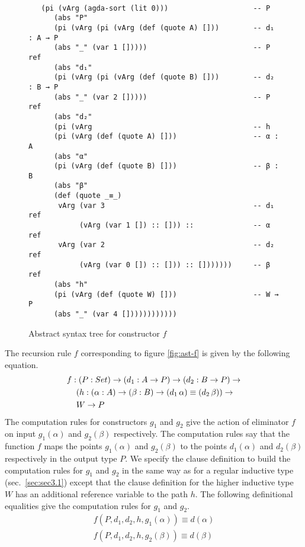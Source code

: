 \documentclass[sigplan,10pt]{acmart}
\begin{document}
\begin{figure}
\begin{center}
\begingroup
\fontsize{7pt}{9pt}\selectfont
\begin{Verbatim}[frame = single]

   (pi (vArg (agda-sort (lit 0)))                    -- P
      (abs "P"
      (pi (vArg (pi (vArg (def (quote A) []))        -- d₁ : A → P
      (abs "_" (var 1 []))))                         -- P ref
      (abs "d₁"
      (pi (vArg (pi (vArg (def (quote B) []))        -- d₂ : B → P
      (abs "_" (var 2 []))))                         -- P ref
      (abs "d₂"
      (pi (vArg                                      -- h
      (pi (vArg (def (quote A) []))                  -- α : A
      (abs "α"
      (pi (vArg (def (quote B) []))                  -- β : B
      (abs "β"
      (def (quote _≡_)
       vArg (var 3                                   -- d₁ ref
            (vArg (var 1 []) :: [])) ::              -- α ref
       vArg (var 2                                   -- d₂ ref
            (vArg (var 0 []) :: [])) :: []))))))     -- β ref
      (abs "h" 
      (pi (vArg (def (quote W) []))                  -- W → P
      (abs "_" (var 4 [])))))))))))

\end{Verbatim}
\endgroup
\end{center}
\caption{Abstract syntax tree for constructor $f$}
\label{fig:ast-f}
\end{figure}

The recursion rule $f$ corresponding to figure \eqref{fig:ast-f} is given by the following equation.
\begin{align}
& f : (P : Set) \rightarrow (d_1 : A \rightarrow P) \rightarrow (d_2 : B \rightarrow P) \rightarrow \nonumber \\
& \hspace {0.4cm} (h : (\alpha : A) \rightarrow (\beta : B) \rightarrow (d_1 \, \alpha) \equiv (d_2 \, \beta)) \rightarrow \nonumber \\
& \hspace {0.4cm} W \rightarrow P \nonumber
\end{align}
The computation rules for constructors $g_1$ and $g_2$ give the action of eliminator $f$ on input $g_1 (\alpha)$ and $g_2 (\beta)$ respectively. The computation rules say that the function $f$ maps the points $g_1 (\alpha)$ and $g_2 (\beta)$ to the points $d_1 (\alpha)$ and $d_2 (\beta)$ respectively in the output type $P$. We specify the clause definition to build the computation rules for $g_1$ and $g_2$ in the same way as for a regular inductive type (sec.~\ref{sec:sec3.1}) except that the clause definition for the higher inductive type $W$ has an additional reference variable to the path $h$. The following definitional equalities give the computation rules for $g_1$ and $g_2$.
\begin{align}
f (P, d_1, d_2, h, g_1 (\alpha)) \equiv d (\alpha) \nonumber \\
f (P, d_1, d_2, h, g_2 (\beta)) \equiv d (\beta) \nonumber
\end{align}
\end{document}
